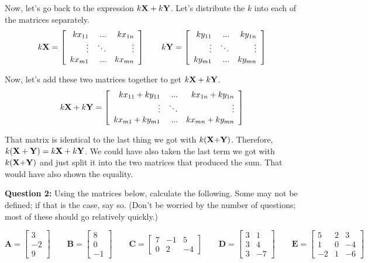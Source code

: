 \documentclass[12pt]{article}
\begin{document}
Now, let's go back to the expression $k\textrm{\textbf{X}} + k\textrm{\textbf{Y}}$. Let's distribute the $k$ into each of the matrices separately.
$$k\textrm{\textbf{X}} = \left[\begin{array}{rrr}
kx_{11} & ... & kx_{1n}\\
\vdots & \ddots & \vdots\\
kx_{m1} & ... & kx_{mn}\end{array}\right] \qquad k\textrm{\textbf{Y}} = \left[\begin{array}{rrr}
ky_{11} & ... & ky_{1n}\\
\vdots & \ddots & \vdots\\
ky_{m1} & ... & ky_{mn}\end{array}\right]$$

Now, let's add these two matrices together to get $k\textrm{\textbf{X}} + k\textrm{\textbf{Y}}$.
$$k\textrm{\textbf{X}} + k\textrm{\textbf{Y}} = \left[\begin{array}{rrr}
kx_{11} + ky_{11} & ... & kx_{1n} + ky_{1n}\\
\vdots & \ddots & \vdots\\
kx_{m1} + ky_{m1} & ... & kx_{mn} + ky_{mn}\end{array}\right]$$

That matrix is identical to the last thing we got with $k(\textrm{\textbf{X}+\textbf{Y}})$. Therefore, $k(\textrm{\textbf{X}} + \textrm{\textbf{Y}}) = k\textrm{\textbf{X}} + k\textrm{\textbf{Y}}$. We could have also taken the last term we got with $k(\textrm{\textbf{X}+\textbf{Y}})$ and just split it into the two matrices that produced the sum. That would have also shown the equality.


\textbf{Question 2:} Using the matrices below, calculate the following. Some may not be defined; if that is the case, say so. (Don't be worried by the number of questions; most of these should go relatively quickly.)

\begin{equation*}
\textbf{A} = \left[\begin{array}{rrr}
3 \\ -2 \\ 9 
\end{array} \right]
\qquad
\textbf{B} = \left[\begin{array}{rrr} 8\\0\\-1\end{array}\right]
\qquad
\textbf{C} = \left[\begin{array}{rrr}
7 & -1 & 5\\
0 & 2 & -4
\end{array}\right]
\qquad
\textbf{D} = \left[\begin{array}{rrr}
3 & 1\\
3 & 4\\
3 & -7
\end{array}\right]
\qquad
\textbf{E}= \left[\begin{array}{rrr}
5 & 2 & 3\\
1 & 0 & -4\\
-2 & 1 & -6
\end{array}\right]
\end{equation*}
\end{document}
